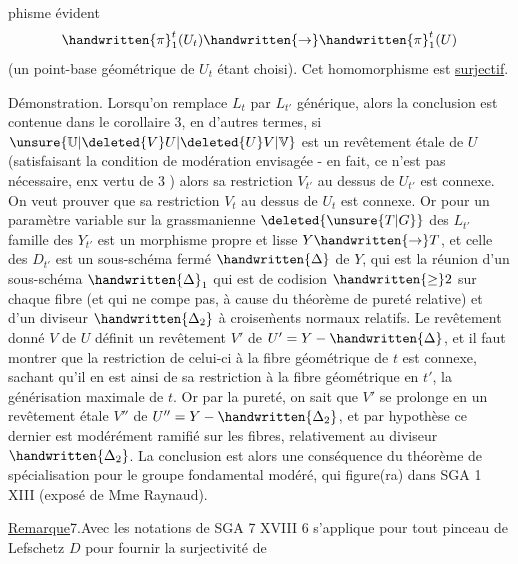 phisme évident
\[
\handwritten{\pi}_1^t(U_t)\handwritten{\rightarrow}\handwritten{\pi}_1^t(U)
\]
(un point-base géométrique de $U_t$ étant choisi). Cet homomorphisme est \uline{surjectif}.

Démonstration. Lorsqu'on remplace $L_t$ par $L_{t'}$ générique, alors la conclusion est contenue dans le corollaire 3, en d'autres termes, si $\unsure{\mathbb{U}|\deleted{V}U|\deleted{U}V|\mathbb{V}}$ est un revêtement étale  de $U$  (satisfaisant la condition de modération envisagée - en fait, ce n'est pas nécessaire, enx vertu de 3 ) alors sa restriction $V_{t'}$ au dessus de $U_{t'}$ est connexe. On veut prouver que sa restriction $V_t$ au dessus de $U_t$ est  connexe. Or pour un paramètre variable sur  la grassmanienne $\deleted{\unsure{T|G}}$ des $L_{t'}$\handwritten{,}   famille des $Y_{t'}$ est un morphisme propre et lisse $Y\handwritten{\rightarrow}T$, et celle des $D_{t'}$ est un sous-schéma fermé  $\handwritten{\Delta}$ de $Y$, qui est la réunion d'un sous-schéma $\handwritten{\Delta}_1$ qui est de codision $\handwritten{\geq}2$ sur chaque fibre (et qui ne compe pas, à cause du théorème de pureté relative) et d'un diviseur $\handwritten{\Delta_2}$ à croise\`{m}ents normaux relatifs. Le revêtement donné $V$ de $U$ définit un revêtement  $V'$ de $U'=Y-\handwritten{\Delta}$, et il faut montrer que la restriction de celui-ci à la fibre géométrique de $t$ est connexe, sachant qu'il en est ainsi de sa restriction à la fibre géométrique en $t'$, la générisation maximale de $t$. Or par la pureté, on sait que $V'$ se prolonge en un revêtement étale $V''$ de $U''=Y-\handwritten{\Delta_2}$, et par hypothèse ce dernier est modérément ramifié sur les fibres, relativement au diviseur $\handwritten{\Delta_2}$. La conclusion est alors une conséquence du théorème  de spécialisation pour le groupe fondamental modéré, qui figure(ra) dans SGA 1 XIII (exposé de Mme Raynaud).

\uline{Remarque}7.Avec les notations de SGA 7 XVIII\handwritten{,} 6 s'applique pour tout pinceau de Lefschetz $D$ pour fournir la surjectivité de

